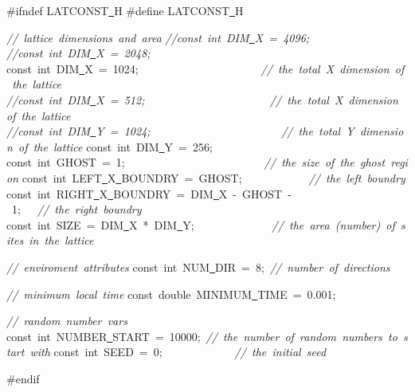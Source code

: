 {\ttfamily \raggedright \footnotesize
\#ifndef LATCONST\underline\ H
\#define LATCONST\underline\ H

\textsl{//\ lattice\ dimensions\ and\ area}
\textsl{//const\ int\ DIM\underline\ X\ =\ 4096;}
\textsl{//const\ int\ DIM\underline\ X\ =\ 2048;}
const\ int\ DIM\underline\ X\ =\ 1024;\ \ \ \ \ \ \ \ \ \ \ \ \ \ \ \ \ \ \ \ \ \ \textsl{//\ the\ total\ X\ dimension\ of\ the\ lattice}
\textsl{//const\ int\ DIM\underline\ X\ =\ 512;\ \ \ \ \ \ \ \ \ \ \ \ \ \ \ \ \ \ \ \ \ \ //\ the\ total\ X\ dimension\ of\ the\ lattice}
\textsl{//const\ int\ DIM\underline\ Y\ =\ 1024;\ \ \ \ \ \ \ \ \ \ \ \ \ \ \ \ \ \ \ \ \ \ \ //\ the\ total\ Y\ dimension\ of\ the\ lattice}
const\ int\ DIM\underline\ Y\ =\ 256;
const\ int\ GHOST\ =\ 1;\ \ \ \ \ \ \ \ \ \ \ \ \ \ \ \ \ \ \ \ \ \ \ \ \ \textsl{//\ the\ size\ of\ the\ ghost\ region}
const\ int\ LEFT\underline\ X\underline\ BOUNDRY\ =\ GHOST;\ \ \ \ \ \ \ \ \ \ \ \ \textsl{//\ the\ left\ boundry}
const\ int\ RIGHT\underline\ X\underline\ BOUNDRY\ =\ DIM\underline\ X\ -{}\ GHOST\ -{}\ 1;\ \ \ \textsl{//\ the\ right\ boundry}
const\ int\ SIZE\ =\ DIM\underline\ X\ *\ DIM\underline\ Y;\ \ \ \ \ \ \ \ \ \ \ \ \ \ \textsl{//\ the\ area\ (number)\ of\ sites\ in\ the\ lattice}

\textsl{//\ enviroment\ attributes}
const\ int\ NUM\underline\ DIR\ =\ 8;\ \textsl{//\ number\ of\ directions}

\textsl{//\ minimum\ local\ time}
const\ double\ MINIMUM\underline\ TIME\ =\ 0.001;

\textsl{//\ random\ number\ vars}
const\ int\ NUMBER\underline\ START\ =\ 10000;\ \textsl{//\ the\ number\ of\ random\ numbers\ to\ start\ with}
const\ int\ SEED\ =\ 0;\ \ \ \ \ \ \ \ \ \ \ \ \ \textsl{//\ the\ initial\ seed}

\#endif


 }
\normalfont\normalsize

